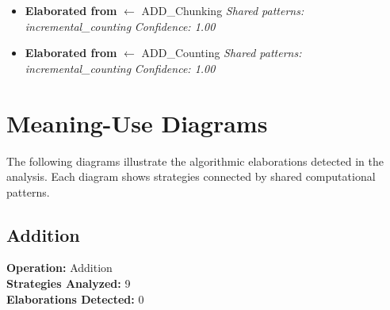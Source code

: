\documentclass{article}
\begin{document}
\begin{itemize}
\item \textbf{Elaborated from} $\leftarrow$ ADD\_Chunking
  \textit{Shared patterns: incremental\_counting}
  \textit{Confidence: 1.00}

\item \textbf{Elaborated from} $\leftarrow$ ADD\_Counting
  \textit{Shared patterns: incremental\_counting}
  \textit{Confidence: 1.00}

\end{itemize}

\section{Meaning-Use Diagrams}

The following diagrams illustrate the algorithmic elaborations detected in the analysis.
Each diagram shows strategies connected by shared computational patterns.

\subsection{Addition}

\textbf{Operation:} Addition\\
\textbf{Strategies Analyzed:} 9\\
\textbf{Elaborations Detected:} 0\\
\end{document}
